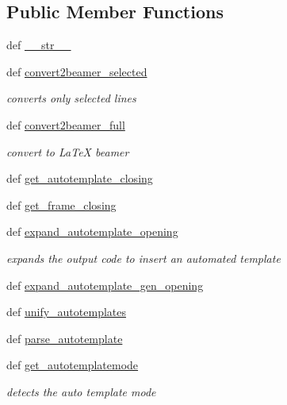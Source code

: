 \subsection*{\-Public \-Member \-Functions}
\begin{DoxyCompactItemize}
\item 
def \hyperlink{classuicilibris_1_1w2beamer_1_1wiki2_ac99f478c1af50144e1c1c004ab9ff659}{\-\_\-\-\_\-str\-\_\-\-\_\-}
\item 
def \hyperlink{classuicilibris_1_1w2beamer_1_1wiki2_a3324e41bbdda1afe28ce5f27689ccaa8}{convert2beamer\-\_\-selected}
\begin{DoxyCompactList}\small\item\em converts only selected lines \end{DoxyCompactList}\item 
def \hyperlink{classuicilibris_1_1w2beamer_1_1wiki2_a3335751f0851f20ac4105204029a9808}{convert2beamer\-\_\-full}
\begin{DoxyCompactList}\small\item\em convert to \-La\-Te\-X beamer \end{DoxyCompactList}\item 
def \hyperlink{classuicilibris_1_1w2beamer_1_1wiki2_a592c26c487db6799f617db81b0466005}{get\-\_\-autotemplate\-\_\-closing}
\item 
def \hyperlink{classuicilibris_1_1w2beamer_1_1wiki2_ab1f64fca38fa5812febde88049e4f9c7}{get\-\_\-frame\-\_\-closing}
\item 
def \hyperlink{classuicilibris_1_1w2beamer_1_1wiki2_acbab4fd2162a8e7a204e00f235893b50}{expand\-\_\-autotemplate\-\_\-opening}
\begin{DoxyCompactList}\small\item\em expands the output code to insert an automated template \end{DoxyCompactList}\item 
def \hyperlink{classuicilibris_1_1w2beamer_1_1wiki2_a31de2fe8c2ec727221fc0db6f7d1c612}{expand\-\_\-autotemplate\-\_\-gen\-\_\-opening}
\item 
def \hyperlink{classuicilibris_1_1w2beamer_1_1wiki2_a1e0b672398214778819169565f21df83}{unify\-\_\-autotemplates}
\item 
def \hyperlink{classuicilibris_1_1w2beamer_1_1wiki2_abc1901a575f216a1427281132078cd7f}{parse\-\_\-autotemplate}
\item 
def \hyperlink{classuicilibris_1_1w2beamer_1_1wiki2_aeeae8754f221fcdaa0031a3ebd29f4ca}{get\-\_\-autotemplatemode}
\begin{DoxyCompactList}\small\item\em detects the auto template mode \end{DoxyCompactList}\item 

\end{DoxyCompactItemize}
